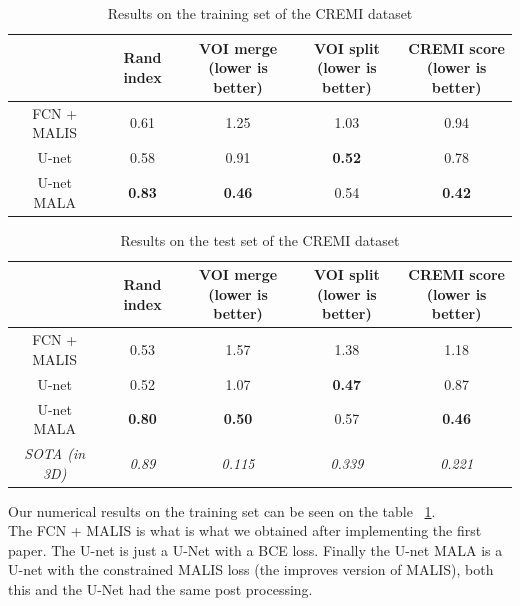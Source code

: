 \begin{table}[!htbp]
	\centering
	\begin{tabular}{|c|c|c|c|c|}
		\hline
		& Rand index & \thead{VOI merge \\(lower is better)} & \thead{VOI split\\(lower is better)} & \thead{CREMI score\\(lower is better)}\\
		\hline
		FCN + MALIS & 0.61 & 1.25 & 1.03 & 0.94\\
		\hline
		U-net & 0.58 & 0.91 & \textbf{0.52} & 0.78\\
		\hline
		U-net MALA & \textbf{0.83} & \textbf{0.46} & 0.54 & \textbf{0.42}\\
		\hline
	\end{tabular}
	\caption{Results on the training set of the CREMI dataset}
\label{tab:cremi_res_train}
\end{table}
\begin{table}[!htbp]
	\centering
	\begin{tabular}{|c|c|c|c|c|}
		\hline
		& Rand index & \thead{VOI merge \\(lower is better)} & \thead{VOI split\\(lower is better)} & \thead{CREMI score\\(lower is better)}\\
		\hline
		FCN + MALIS & 0.53 & 1.57 & 1.38 & 1.18\\
		\hline
		U-net & 0.52 & 1.07 & \textbf{0.47} & 0.87\\
		\hline
		U-net MALA & \textbf{0.80} & \textbf{0.50} & 0.57 & \textbf{0.46}\\
		\hline
		\hline
		\textit{SOTA (in 3D)} & \textit{0.89} & \textit{0.115} & \textit{0.339}& \textit{0.221}\\
		\hline
	\end{tabular}
	\caption{Results on the test set of the CREMI dataset}
\label{tab:cremi_res_test}
\end{table}

Our numerical results on the training set can be seen on the table ~\ref{tab:cremi_res_train}.\\
The FCN + MALIS is what is what we obtained after implementing the first paper.
The U-net is just a U-Net with a BCE loss.
Finally the U-net MALA is a U-net with the constrained MALIS loss (the improves
version of MALIS), both this and the U-Net had the same post processing.\\

